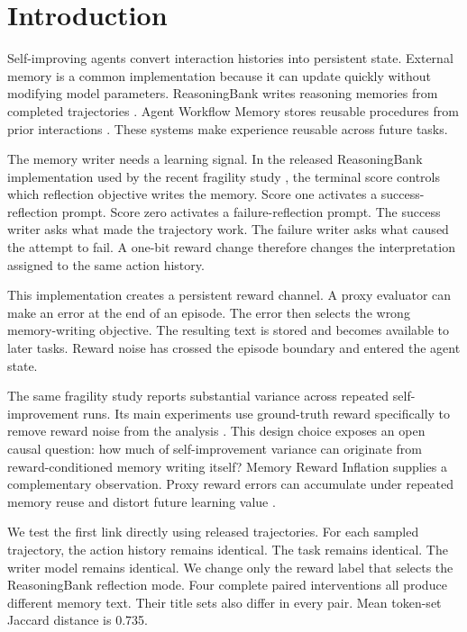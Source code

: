 \section{Introduction}
Self-improving agents convert interaction histories into persistent state. External memory is a common implementation because it can update quickly without modifying model parameters. ReasoningBank writes reasoning memories from completed trajectories \citep{ouyang2026reasoningbank}. Agent Workflow Memory stores reusable procedures from prior interactions \citep{wang2024awm}. These systems make experience reusable across future tasks.

The memory writer needs a learning signal. In the released ReasoningBank implementation used by the recent fragility study \citep{ye2026fragility}, the terminal score controls which reflection objective writes the memory. Score one activates a success-reflection prompt. Score zero activates a failure-reflection prompt. The success writer asks what made the trajectory work. The failure writer asks what caused the attempt to fail. A one-bit reward change therefore changes the interpretation assigned to the same action history.

This implementation creates a persistent reward channel. A proxy evaluator can make an error at the end of an episode. The error then selects the wrong memory-writing objective. The resulting text is stored and becomes available to later tasks. Reward noise has crossed the episode boundary and entered the agent state.

The same fragility study reports substantial variance across repeated self-improvement runs. Its main experiments use ground-truth reward specifically to remove reward noise from the analysis \citep{ye2026fragility}. This design choice exposes an open causal question: how much of self-improvement variance can originate from reward-conditioned memory writing itself? Memory Reward Inflation supplies a complementary observation. Proxy reward errors can accumulate under repeated memory reuse and distort future learning value \citep{asadolahi2026inflation}.

We test the first link directly using released trajectories. For each sampled trajectory, the action history remains identical. The task remains identical. The writer model remains identical. We change only the reward label that selects the ReasoningBank reflection mode. Four complete paired interventions all produce different memory text. Their title sets also differ in every pair. Mean token-set Jaccard distance is 0.735.

